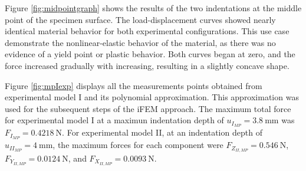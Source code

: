 Figure \ref{fig:midpointgraph} shows the results of the two indentations at the middle point 
 of the specimen surface.
The load-displacement curves showed nearly identical material behavior for both 
experimental configurations. This use case demonstrate the nonlinear-elastic behavior of the material, 
as there was no evidence of a yield point or plastic behavior. 
Both curves began at zero, and the force increased gradually with increasing,
resulting in a slightly concave shape. 

Figure \ref{fig:mpIexp} displays all the measurements points obtained from experimental model I and its 
polynomial approximation. This approximation was used for the subsequent steps of the iFEM approach. The 
maximum total force for experimental model I at a maximun indentation depth of 
$u_{I_{MP}} = \SI{3.8}{\milli \m}$ was $F_{I_{MP}} = \SI{0.4218}{\newton}$. For experimental 
model II, at an indentation depth of 
$u_{II_{MP}} = \SI{4}{\milli \m}$, the maximum forces for each component were
$F_{Z_{II,MP}} = \SI{0.546}{\newton}$, $F_{Y_{II,MP}} = \SI{0.0124}{\newton}$, and $F_{X_{II,MP}} = \SI{0.0093}{\newton}$.\\

